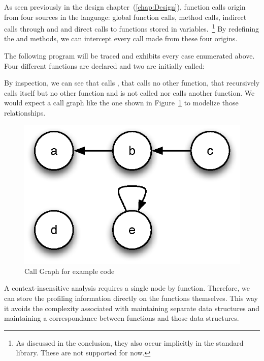 As seen previously in the design chapter~(\ref{chap:Design}), function calls
origin from four sources in the language: global function calls, method calls,
indirect calls through  and  and direct calls to functions
stored in variables.~\footnote{As discussed in the conclusion, they also occur
implicitly in the standard library. These are not supported for now.} By
redefining the  and  methods, we can intercept every call
made from these four origins.

The following program will be traced and exhibits every case enumerated
above. Four different functions are declared and two are initially called:


By inspection, we can see that  calls , that  calls no other
function, that  recursively calls itself but no other function and 
is not called nor calls another function. We would expect a call graph like the
one shown in Figure~\ref{fig:CallGraph} to modelize those relationships.

\begin{figure}[htb]
\begin{center}
\includegraphics{figures/callgraph}
\caption{\label{fig:CallGraph} Call Graph for example code}
\end{center}
\end{figure}

A context-insensitive analysis requires a single node by function. Therefore,
we can store the profiling information directly on the functions themselves.
This way it avoids the complexity associated with maintaining separate data
structures and maintaining a correspondance between functions and those data
structures.

